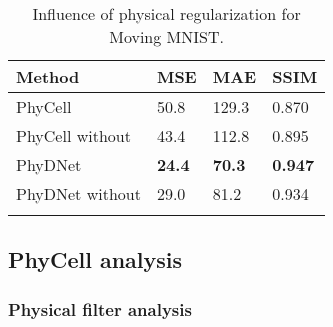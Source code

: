 \documentclass[10pt,twocolumn,letterpaper]{article}
\begin{document}
\begin{table}[H]
\centering
    \begin{adjustbox}{max width=\columnwidth}
    \begin{tabular}{l|lll}
    \Xhline{2\arrayrulewidth}
     \hline
    Method  & MSE & MAE & SSIM  \\  \hline \hline
    PhyCell & 50.8 & 129.3  & 0.870    \\ 
    PhyCell without   & 43.4  & 112.8  & 0.895   \\ 
    PhyDNet &  \textbf{24.4}  & \textbf{70.3}  & \textbf{0.947}   \\     
    PhyDNet without  & 29.0  & 81.2 & 0.934   \\ 
    \Xhline{2\arrayrulewidth}
    \end{tabular}
    \end{adjustbox}
    \caption{Influence of physical regularization for Moving MNIST. }
    \label{tab:ablation2} 
\end{table}


\subsection{PhyCell analysis}
\label{sec:expe_prediction}


 
\subsubsection{Physical filter analysis}
\end{document}
